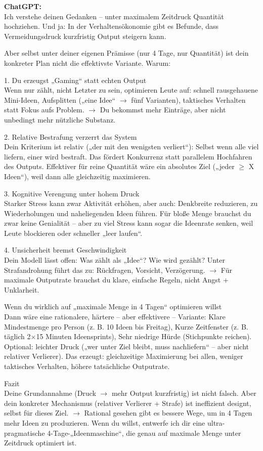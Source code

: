 \begin{kichat}
\textbf{ChatGPT:}\\
Ich verstehe deinen Gedanken – unter maximalem Zeitdruck Quantität hochziehen. Und ja: In der Verhaltensökonomie gibt es Befunde, dass Vermeidungsdruck kurzfristig Output steigern kann.

Aber selbst unter deiner eigenen Prämisse (nur 4 Tage, nur Quantität) ist dein konkreter Plan nicht die effektivste Variante. Warum:

1. Du erzeugst „Gaming“ statt echten Output\\
Wenn nur zählt, nicht Letzter zu sein, optimieren Leute auf: schnell rausgehauene Mini-Ideen, Aufsplitten („eine Idee“ $\rightarrow$ fünf Varianten), taktisches Verhalten statt Fokus aufs Problem. $\rightarrow$ Du bekommst mehr Einträge, aber nicht unbedingt mehr nützliche Substanz.

2. Relative Bestrafung verzerrt das System\\
Dein Kriterium ist relativ („der mit den wenigsten verliert“): Selbst wenn alle viel liefern, einer wird bestraft. Das fördert Konkurrenz statt parallelem Hochfahren des Outputs. Effektiver für reine Quantität wäre ein absolutes Ziel („jeder $\geq$ X Ideen“), weil dann alle gleichzeitig maximieren.

3. Kognitive Verengung unter hohem Druck\\
Starker Stress kann zwar Aktivität erhöhen, aber auch: Denkbreite reduzieren, zu Wiederholungen und naheliegenden Ideen führen. Für bloße Menge brauchst du zwar keine Genialität – aber zu viel Stress kann sogar die Ideenrate senken, weil Leute blockieren oder schneller „leer laufen“.

4. Unsicherheit bremst Geschwindigkeit\\
Dein Modell lässt offen: Was zählt als „Idee“? Wie wird gezählt? Unter Strafandrohung führt das zu: Rückfragen, Vorsicht, Verzögerung. $\rightarrow$ Für maximale Outputrate brauchst du klare, einfache Regeln, nicht Angst + Unklarheit.

Wenn du wirklich auf „maximale Menge in 4 Tagen“ optimieren willst\\
Dann wäre eine rationalere, härtere – aber effektivere – Variante: Klare Mindestmenge pro Person (z. B. 10 Ideen bis Freitag), Kurze Zeitfenster (z. B. täglich 2$\times$15 Minuten Ideensprints), Sehr niedrige Hürde (Stichpunkte reichen). Optional: leichter Druck („wer unter Ziel bleibt, muss nachliefern“ – aber nicht relativer Verlierer). Das erzeugt: gleichzeitige Maximierung bei allen, weniger taktisches Verhalten, höhere tatsächliche Outputrate.

Fazit\\
Deine Grundannahme (Druck $\rightarrow$ mehr Output kurzfristig) ist nicht falsch. Aber dein konkreter Mechanismus (relativer Verlierer + Strafe) ist ineffizient designt, selbst für dieses Ziel. $\rightarrow$ Rational gesehen gibt es bessere Wege, um in 4 Tagen mehr Ideen zu produzieren. Wenn du willst, entwerfe ich dir eine ultra-pragmatische 4-Tage-„Ideenmaschine“, die genau auf maximale Menge unter Zeitdruck optimiert ist.
\end{kichat}

